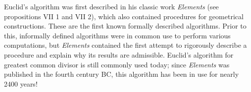 \documentclass[12pt]{article}
\theoremstyle{definition}
\theoremstyle{definition}
\theoremstyle{definition}
\begin{document}
Euclid's algorithm was first described in his classic work {\it Elements} (see propositions VII 1 and VII 2),
which also contained procedures
for geometrical constructions. These are the first known 
formally described algorithms. Prior to this, informally defined algorithms were in common use to 
perform various computations, but {\it Elements} contained the first attempt to rigorously 
describe a procedure and explain why its results are admissible. Euclid's algorithm for greatest 
common divisor is still commonly used today; since {\it Elements} was published in the fourth 
century BC, this algorithm has been in use for nearly 2400 years!
\end{document}
